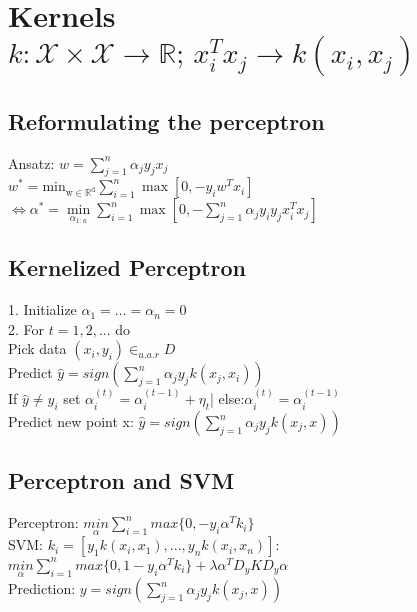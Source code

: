 \section*{Kernels $k: \mathcal{X} \times \mathcal{X} \rightarrow \mathbb{R};\, x_i^Tx_j \rightarrow k(x_i,x_j)$}
\subsection*{Reformulating the perceptron}
Ansatz: $w=\sum_{j=1}^n \alpha_j y_j x_j$\\
$w^*=\operatorname{min_{w\in\mathbb{R}^d}} \sum_{i=1}^n \max [0, -y_i w^T x_i]$\\
$\Leftrightarrow \alpha^* = \min \limits_{\alpha_{1:n}} \sum_{i=1}^n \max  [0,- \sum_{j=1}^n \alpha_j y_i y_j x_i^T x_j ]$


\subsection*{Kernelized Perceptron}
1. Initialize $\alpha_1 = ... = \alpha_n = 0$\\
2. For $t = 1, 2, ...$ do \\
Pick data $(x_i,y_i) \in_{u.a.r} D$\\
Predict $\hat{y} = sign(\sum_{j=1}^n \alpha_j y_j k(x_j,x_i))$\\
If $\hat{y} \not = y_i$ set $\alpha_i^{(t)} = \alpha_i^{(t-1)} + \eta_t$| else:$\alpha_i^{(t)} = \alpha_i^{(t-1)}$\\
Predict new point x: $\hat{y} = sign(\sum_{j=1}^n \alpha_j y_j k(x_j,x))$

\subsection*{Perceptron and SVM}
Perceptron: $\underset{\alpha}{min}\sum_{i=1}^n max\{0,-y_i \alpha^T k_i\}$\\
SVM: $k_i=[y_1 k(x_i,x_1), ..., y_n k(x_i,x_n)]$:\\
$\underset{\alpha}{min}\sum_{i=1}^n max\{0,1-y_i \alpha^T k_i\} +\lambda\alpha^T D_y K D_y \alpha$\\
Prediction: $y = sign(\sum_{j=1}^n \alpha_j y_j k(x_j,x))$

